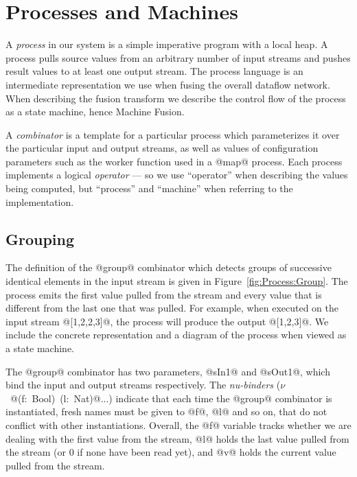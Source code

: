 
\section{Processes and Machines}
\label{s:Processes}

A \emph{process} in our system is a simple imperative program with a local heap. A process pulls source values from an arbitrary number of input streams and pushes result values to at least one output stream. The process language is an intermediate representation we use when fusing the overall dataflow network. When describing the fusion transform we describe the control flow of the process as a state machine, hence Machine Fusion. 

A \emph{combinator} is a template for a particular process which parameterizes it over the particular input and output streams, as well as values of configuration parameters such as the worker function used in a @map@ process. Each process implements a logical \emph{operator} --- so we use ``operator'' when describing the values being computed, but ``process'' and ``machine'' when referring to the implementation. 


\subsection{Grouping}

The definition of the @group@ combinator which detects groups of successive identical elements in the input stream is given in Figure~\ref{fig:Process:Group}. The process emits the first value pulled from the stream and every value that is different from the last one that was pulled. For example, when executed on the input stream @[1,2,2,3]@, the process will produce the output @[1,2,3]@. We include the concrete representation and a diagram of the process when viewed as a state machine.

The @group@ combinator has two parameters, @sIn1@ and @sOut1@, which bind the input and output streams respectively. The \emph{nu-binders} \mbox{($\nu$ @(f: Bool) (l: Nat)@...)} indicate that each time the @group@ combinator is instantiated, fresh names must be given to @f@, @l@ and so on, that do not conflict with other instantiations. Overall, the @f@ variable tracks whether we are dealing with the first value from the stream, @l@ holds the last value pulled from the stream (or 0 if none have been read yet), and @v@ holds the current value pulled from the stream. 

